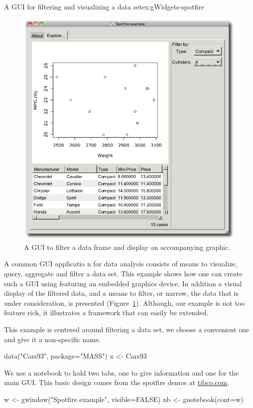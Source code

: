 \begin{example}{A GUI for filtering and visualizing a data set}{ex:gWidgets-spotfire}

\begin{figure}
  \centering
  \includegraphics[width=.6\textwidth]{fig-gWidgets-spotfire-gui}
  \caption{A GUI to filter a data frame and display an accompanying graphic.}
  \label{fig:gWidgets-spotfire-gui}
\end{figure}
A common GUI applicatio
n for data analysis consists of means to
visualize, query, aggregate and filter a data set. This example shows
how one can create such a GUI using  featuring
an embedded graphics device. In addition a visual display of the filtered data,
and a means to filter, or narrow, the data that is under
consideration, is presented (Figure~\ref{fig:gWidgets-spotfire-gui}).
Although, our example is not too feature rich, it illustrates a
framework that can easily be extended.


This example is centered around filtering a data set, we choose a
convenient one and give it a non-specific name.
\begin{Schunk}
\begin{Sinput}
 data("Cars93", package="MASS")
 x <- Cars93
\end{Sinput}
\end{Schunk}

We use a notebook to hold two tabs, one to give information and one
for the main GUI. This basic design comes from the spotfire demos at \url{tibco.com}.
\begin{Schunk}
\begin{Sinput}
 w <- gwindow("Spotfire example", visible=FALSE)
 nb <- gnotebook(cont=w)
\end{Sinput}
\end{Schunk}



\end{example}
